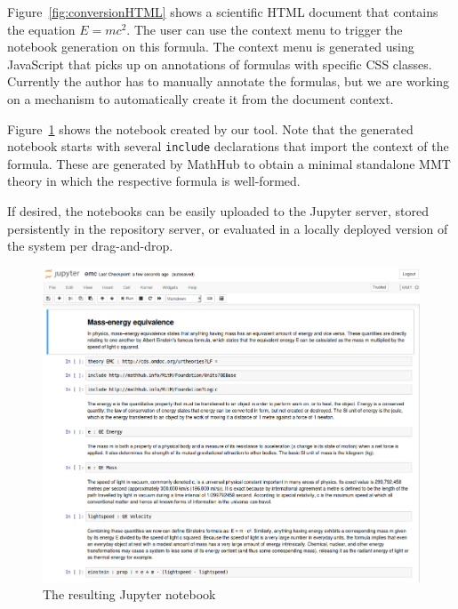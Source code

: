 Figure~\ref{fig:conversionHTML} shows a scientific HTML document that contains the equation $E=mc^2$.
The user can use the context menu to trigger the notebook generation on this formula.
The context menu is generated using JavaScript that picks up on annotations of formulas with specific CSS classes.
Currently the author has to manually annotate the formulas, but we are working on a mechanism to automatically create it from the document context.

Figure~\ref{fig:conversionNotebook} shows the notebook created by our tool.
Note that the generated notebook starts with several \texttt{include} declarations that import the context of the formula.
These are generated by MathHub to obtain a minimal standalone MMT theory in which the respective formula is well-formed. 

If desired, the notebooks can be easily uploaded to the Jupyter server, stored persistently in the repository server, or evaluated in a locally deployed version of the system per drag-and-drop.

\begin{figure}[ht]\centering
\includegraphics[width=15cm]{../D4.11/conversionNotebook}
\caption{The resulting Jupyter notebook}
\label{fig:conversionNotebook}
\end{figure}



